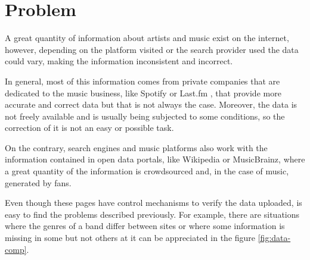 \section{Problem}
A great quantity of information about artists and music exist on the internet, however, depending on the platform visited or the search provider used the data could vary, making the information inconsistent and incorrect.  

In general, most of this information comes from private companies that are dedicated to the music business, like Spotify \citep{spotify} or Last.fm \citep{lastfm}, that provide more accurate and correct data but that is not always the case. Moreover, the data is not freely available and is usually being subjected to some conditions, so the correction of it is not an easy or possible task.  

On the contrary, search engines and music platforms also work with the information contained in open data portals, like Wikipedia or MusicBrainz, where a great quantity of the information is crowdsourced and, in the case of music, generated by fans.  

Even though these pages have control mechanisms to verify the data uploaded, is easy to find the problems described previously. For example, there are situations where the genres of a band differ between sites or where some information is missing in some but not others at it can be appreciated in the figure \ref{fig:data-comp}.

